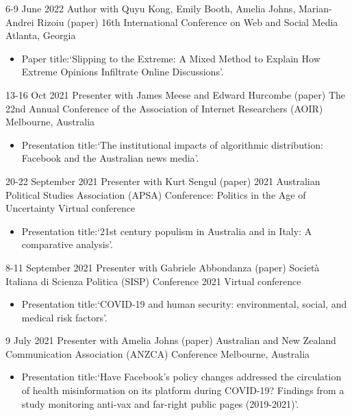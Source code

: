 \documentclass[11pt,a4paper,sans]{moderncv}
\begin{document}
\cventry %
{6-9 June 2022}
{Author with Quyu Kong, Emily Booth, Amelia Johns, Marian-Andrei Rizoiu (paper)}
{16th International Conference on Web and Social Media}
{Atlanta, Georgia}
{}
       {
      \begin{itemize} %
        \item {Paper title:`Slipping to the {Extreme}: {A} {Mixed} {Method} to {Explain} {How} {Extreme} {Opinions} {Infiltrate} {Online} {Discussions}'.}
      \end{itemize}
    }
    
\cventry %
{13-16 Oct 2021}
{Presenter with James Meese and Edward Hurcombe (paper)}
{The 22nd Annual Conference of the Association of Internet Researchers
  (AOIR)}
{Melbourne, Australia}
{}
       {
      \begin{itemize} %
        \item {Presentation title:`The institutional impacts of algorithmic distribution: Facebook and the Australian news media'.}
      \end{itemize}
    }

\cventry %
{20-22 September 2021}
{Presenter with Kurt Sengul (paper)}
{2021 Australian Political Studies Association (APSA) Conference: Politics in the Age of Uncertainty}
{Virtual conference}
{}
       {
      \begin{itemize} %
        \item {Presentation title:`21st century populism in Australia and in Italy: A comparative analysis'.}
      \end{itemize}
    }

 \cventry
    {8-11 September 2021}
    {Presenter with Gabriele Abbondanza (paper)}
    {Società Italiana di Scienza Politica (SISP) Conference 2021}
    {Virtual conference}{}
       {
      \begin{itemize} %
        \item {Presentation title:`COVID-19 and human security: environmental, social, and medical risk factors'.}
      \end{itemize}
    }


\cventry %
{9 July 2021}
{Presenter with Amelia Johns (paper)}
{Australian and New Zealand Communication Association (ANZCA) Conference}
{Melbourne, Australia}
{}
       {
      \begin{itemize} %
        \item {Presentation title:`Have Facebook's policy changes
            addressed the circulation of health misinformation on its
            platform during COVID-19? Findings from a study monitoring
            anti-vax and far-right public pages (2019-2021)'.}
      \end{itemize}
    }
\end{document}
